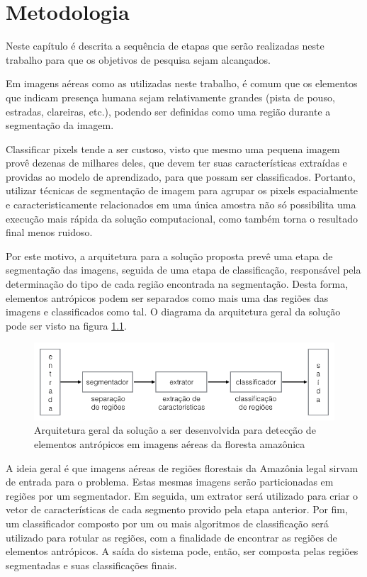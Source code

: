 \chapter{Metodologia}\label{cap:metodologia}

Neste capítulo é descrita a sequência de etapas que serão realizadas neste trabalho para que os objetivos de pesquisa sejam alcançados.

Em imagens aéreas como as utilizadas neste trabalho, é comum que os elementos que indicam presença humana sejam relativamente grandes (pista de pouso, estradas, clareiras, etc.), podendo ser definidas como uma região durante a segmentação da imagem.

Classificar pixels tende a ser custoso, visto que mesmo uma pequena imagem provê dezenas de milhares deles, que devem ter suas características extraídas e providas ao modelo de aprendizado, para que possam ser classificados. Portanto, utilizar técnicas de segmentação de imagem para agrupar os pixels espacialmente e caracteristicamente relacionados em uma única amostra não só possibilita uma execução mais rápida da solução computacional, como também torna o resultado final menos ruidoso.

Por este motivo, a arquitetura para a solução proposta prevê uma etapa de segmentação das imagens, seguida de uma etapa de classificação, responsável pela determinação do tipo de cada região encontrada na segmentação. Desta forma, elementos antrópicos podem ser separados como mais uma das regiões das imagens e classificados como tal. O diagrama da arquitetura geral da solução pode ser visto na figura \ref{fig:metDiagramaGeral}.

\begin{figure}[h]
    \includegraphics[width=\textwidth]{imgs/arquitetura_geral}
    \caption{Arquitetura geral da solução a ser desenvolvida para detecção de elementos antrópicos em imagens aéreas da floresta amazônica}
    \label{fig:metDiagramaGeral}
\end{figure}

A ideia geral é que imagens aéreas de regiões florestais da Amazônia legal sirvam de entrada para o problema. Estas mesmas imagens serão particionadas em regiões por um segmentador. Em seguida, um extrator será utilizado para criar o vetor de características de cada segmento provido pela etapa anterior. Por fim, um classificador composto por um ou mais algoritmos de classificação será utilizado para rotular as regiões, com a finalidade de encontrar as regiões de elementos antrópicos. A saída do sistema pode, então, ser composta pelas regiões segmentadas e suas classificações finais.

